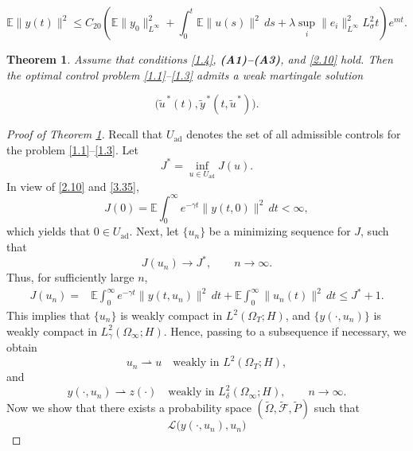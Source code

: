 \documentclass[10pt,a4paper]{amsart}
\newtheorem{theorem}{Theorem}
\begin{document}
\begin{equation}
\mathbb{E}\|y(t)\|^2
\leq
C_{20}
\left(
\mathbb{E}\|y_0\|_{L^{\infty}}^2 
+
\int_0^t
\mathbb{E}\|u(s)\|^2\,ds
+ \lambda \sup_{i}\|e_i\|_{L^\infty}^2 L_{\sigma}^2 t \right) e^{mt}.
\label{3.35}
\end{equation}

\begin{theorem}\label{Th:2.4}
Assume that conditions \eqref{1.4},
{{\bf \rm(A1)--(A3)}}, and \eqref{2.10} hold.
Then the optimal control problem
\eqref{1.1}--\eqref{1.3}
admits a weak martingale solution

\[
\bigl(
\widetilde u^{\,*}(t),
\widetilde y^{\,*}(t,\widetilde u^{\,*})
\bigr).
\]
\end{theorem}

\begin{proof}[Proof of Theorem \ref{Th:2.4}]
Recall that $U_{\mathrm{ad}}$ denotes the set of all admissible controls
for the problem \eqref{1.1}--\eqref{1.3}. Let
\[
J^*
=
\inf_{u\in U_{\mathrm{ad}}}J(u).
\] 
In view of \eqref{2.10} and
\eqref{3.35},
\[
J(0)
=
\mathbb{E}\int_0^\infty
e^{-\gamma t}
\|y(t,0)\|^2\,dt
<
\infty,
\]
which yields that $0 \in U_{\mathrm{ad}}$. Next, let $\{u_n\}$ be a minimizing sequence for $J$, such that
\begin{equation}
J(u_n)
\to
J^*,
\qquad n\to\infty.
\label{4.18}
\end{equation}
Thus, for sufficiently large $n$,
\begin{equation}
\begin{aligned}
J(u_n)
={}&
\mathbb{E}\int_0^\infty
e^{-\gamma t}
\|y(t,u_n)\|^2\,dt
+
\mathbb{E}\int_0^\infty
\|u_n(t)\|^2\,dt 
\leq
J^*+1.
\end{aligned}
\label{4.19}
\end{equation}
This implies that $\{u_n\}$ is weakly compact in
$L^2(\Omega_T;H)$, and
$\{y(\cdot,u_n)\}$ is weakly compact in
$L_\gamma^2(\Omega_\infty;H)$. Hence, passing to a subsequence if
necessary, we obtain
\begin{equation}
u_n
\rightharpoonup
u
\quad\text{weakly in }
L^2(\Omega_T;H),
\end{equation}
and
\begin{equation}
y(\cdot,u_n)
\rightharpoonup
z(\cdot)
\quad\text{weakly in }
L_\delta^2(\Omega_\infty;H),
\qquad n\to\infty.
\label{4.20}
\end{equation}
Now we show that there exists a probability space
$(\widetilde{\Omega},\widetilde{\mathcal{F}},\widetilde{P})$ such that
\[
\mathcal{L}\bigl(y(\cdot,u_n),u_n\bigr)
\]
\end{proof}
\end{document}
